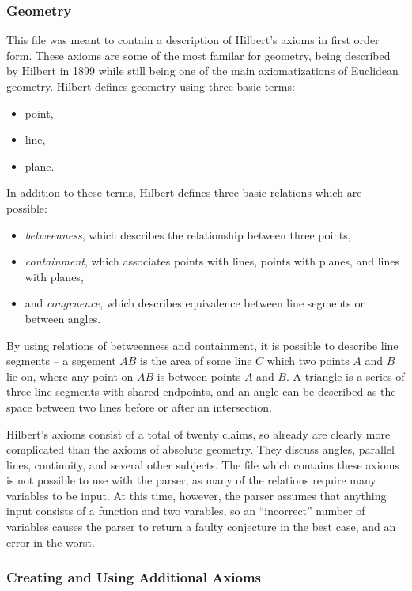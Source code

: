 \subsubsection{Geometry}

This file was meant to contain a description of Hilbert's axioms in first order form. These axioms are some of the most familar for geometry, being described by Hilbert in 1899 while still being one of the main axiomatizations of Euclidean geometry. Hilbert defines geometry using three basic terms:
\begin{itemize}
	\item point,
	\item line,
	\item plane.
\end{itemize}

\noindent
In addition to these terms, Hilbert defines three basic relations which are possible:
\begin{itemize}
	\item \textit{betweenness}, which describes the relationship between three points,
	\item \textit{containment}, which associates points with lines, points with planes, and lines with planes,
	\item and \textit{congruence}, which describes equivalence between line segments or between angles.
\end{itemize}

By using relations of betweenness and containment, it is possible to describe line segments -- a segement $AB$ is the area of some line $C$ which two points $A$ and $B$ lie on, where any point on $AB$ is between points $A$ and $B$. A triangle is a series of three line segments with shared endpoints, and an angle can be described as the space between two lines before or after an intersection.

Hilbert's axioms consist of a total of twenty claims, so already are clearly more complicated than the axioms of absolute geometry. They discuss angles, parallel lines, continuity, and several other subjects. The file which contains these axioms is not possible to use with the parser, as many of the relations require many variables to be input. At this time, however, the parser assumes that anything input consists of a function and two varables, so an ``incorrect'' number of variables causes the parser to return a faulty conjecture in the best case, and an error in the worst.

\subsubsection{Creating and Using Additional Axioms}


